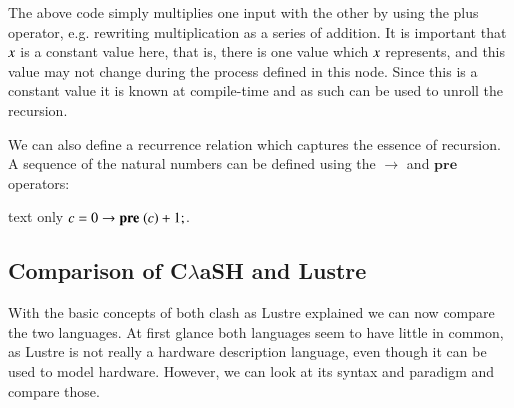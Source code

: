 The above code simply multiplies one input with the other by using the plus operator, e.g. rewriting multiplication as a series of addition.
It is important that \ensuremath{\Varid{x}} is a constant value here, that is, there is one value which \ensuremath{\Varid{x}} represents, and this value may not change during the process defined in this node.
Since this is a constant value it is known at compile-time and as such can be used to unroll the recursion.

We can also define a recurrence relation which captures the essence of recursion.
A sequence of the natural numbers can be defined using the $\rightarrow$ and \ensuremath{\textbf{pre}} operators:\\
\begin{changemargin}{1cm}{0cm}
\begin{expansionno}{text only}
\ensuremath{\Varid{c}\mathrel{=}\mathrm{0}\to \textbf{pre}\;(\Varid{c})\mathbin{+}\mathrm{1};}.
\end{expansionno}
\end{changemargin}

\subsection{Comparison of C$\lambda$aSH and Lustre}
With the basic concepts of both \gls{clash} as Lustre explained we can now compare the two languages.
At first glance both languages seem to have little in common, as Lustre is not really a hardware description language, even though it can be used to model hardware.
However, we can look at its syntax and paradigm and compare those.

